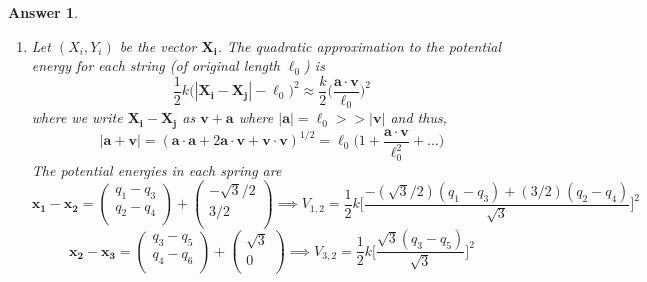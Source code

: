 \documentclass[a4paper]{article}
\newtheorem{ans}{Answer}[section]
\theoremstyle{new}
\begin{document}
\begin{ans}
\begin{enumerate}[label=(\roman*)]
where $\ell_0=\sqrt{3}$, $\ell_A=\sqrt{(X_1-X_2)^2+(Y_1-Y_2)^2}$, $\ell_B=\sqrt{(X_2-X_3)^2+(Y_2-Y_3)^2}$ and $\ell_C=\sqrt{(X_1-X_3)^2+(Y_1-Y_3)^2}$.\\[5pt]
Suppose we do an overall translation, say $X_i\mapsto X_i+\varepsilon$ and $Y_i\mapsto Y_i+\eta$, then we merely have $\dot{X}_i$ invariant and thus the kinetic energy $T$ is invariant. The extent of stretching is also unchanged, hence the potential energy $V$ is invariant. Now suppose we do a rigid rotation, then the position of the centre of mass is unchanged and the extensions of the springs are unchanged. Hence, the kinetic energy $T$ and potential energy $V$ are invariant.\\[5pt]
Equilibrium: When the strings have length $\sqrt{3}$ each, they are unstretched, and the masses are stationary, hence no kinetic energy and potential energy. With zero energy, the system is trivially at equilibrium.
\item Let $(X_i,Y_i)$ be the vector $\mathbf{X_i}$. The quadratic approximation to the potential energy for each string (of original length $\ell_0$) is
$$\frac{1}{2}k\bigg(|\mathbf{X_i}-\mathbf{X_j}|-\ell_0\bigg)^2\approx\frac{k}{2}\bigg(\frac{\mathbf{a}\cdot\mathbf{v}}{\ell_0}\bigg)^2$$
where we write $\mathbf{X_i}-\mathbf{X_j}$ as $\mathbf{v}+\mathbf{a}$ where $|\mathbf{a}|=\ell_0>>|\mathbf{v}|$ and thus, 
$$|\mathbf{a}+\mathbf{v}|=(\mathbf{a}\cdot\mathbf{a}+2\mathbf{a}\cdot\mathbf{v}+\mathbf{v}\cdot\mathbf{v})^{1/2}=\ell_0\bigg(1+\frac{\mathbf{a}\cdot\mathbf{v}}{\ell_0^2}+\dots\bigg)$$
The potential energies in each spring are
$$\mathbf{x_1}-\mathbf{x_2}=\begin{pmatrix}q_1-q_3\\q_2-q_4\\\end{pmatrix}+\begin{pmatrix}-\sqrt{3}/2\\3/2\\\end{pmatrix}\implies V_{1,2}=\frac{1}{2}k\bigg[\frac{-(\sqrt{3}/2)(q_1-q_3)+(3/2)(q_2-q_4)}{\sqrt{3}}\bigg]^2$$
$$\mathbf{x_2}-\mathbf{x_3}=\begin{pmatrix}q_3-q_5\\q_4-q_6\\\end{pmatrix}+\begin{pmatrix}\sqrt{3}\\0\\\end{pmatrix}\implies V_{3,2}=\frac{1}{2}k\bigg[\frac{\sqrt{3}(q_3-q_5)}{\sqrt{3}}\bigg]^2$$

\end{enumerate}
\end{ans}
\end{document}
